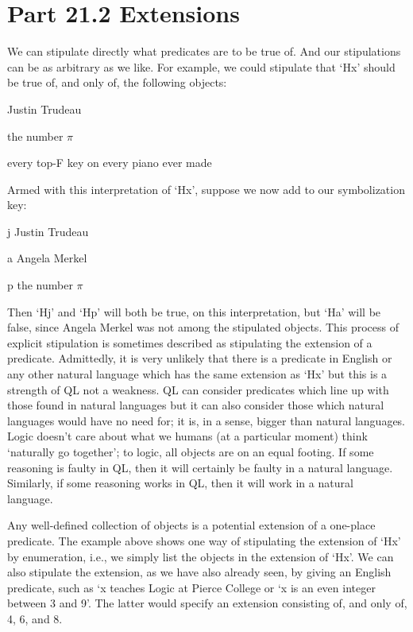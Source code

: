 \section{Part 21.2 Extensions}
We can stipulate directly what predicates are to be true of. And our stipulations can be as arbitrary as we like. For example, we could stipulate that ‘Hx’ should be true of, and only of, the following objects:
\begin{earg}
\item[]Justin Trudeau
\item[]the number $\pi$
\item[]every top-F key on every piano ever made
\end{earg}
Armed with this interpretation of ‘Hx’, suppose we now add to our symbolization key:
\begin{ekey}
\item[j] Justin Trudeau
\item[a] Angela Merkel
\item[p] the number $\pi$
\end{ekey}
Then ‘Hj’ and ‘Hp’ will both be true, on this interpretation, but ‘Ha’ will be false, since Angela Merkel was not among the stipulated objects. This process of explicit stipulation is sometimes described as stipulating the extension of a predicate. Admittedly, it is very unlikely that there is a predicate in English or any other natural language which has the same extension as ‘Hx' but this is a strength of QL not a weakness. QL can consider predicates which line up with those found in natural languages but it can also consider those which natural languages would have no need for; it is, in a sense, bigger than natural languages. Logic doesn’t care about what we humans (at a particular moment) think ‘naturally go together’; to logic, all objects are on an equal footing. If some reasoning is faulty in QL, then it will certainly be faulty in a natural language. Similarly, if some reasoning works in QL, then it will work in a natural language. 

Any well-defined collection of objects is a potential extension of a one-place predicate. The example above shows one way of stipulating the extension of ‘Hx’ by enumeration, i.e., we simply list the objects in the extension of ‘Hx’. We can also stipulate the extension, as we have also already seen, by giving an English predicate, such as ‘x teaches Logic at Pierce College or ‘x is an even integer between 3 and 9’. The latter would specify an extension consisting of, and only of, 4, 6, and 8.

